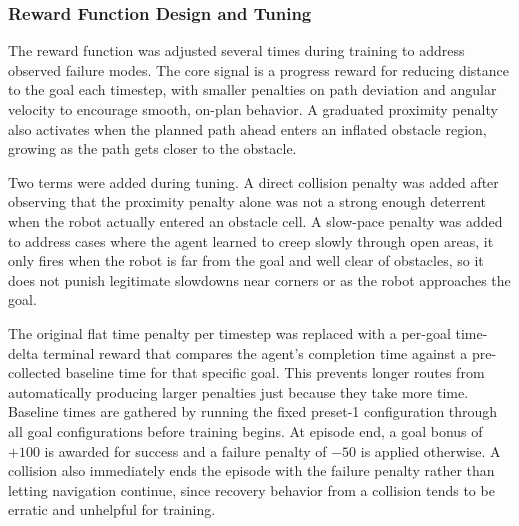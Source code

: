 \documentclass[conference]{IEEEtran}
\begin{document}
        \subsubsection{Reward Function Design and Tuning}
        The reward function was adjusted several times during training to address observed failure modes. The core signal is a progress reward for reducing distance to the goal each timestep, with smaller penalties on path deviation and angular velocity to encourage smooth, on-plan behavior. A graduated proximity penalty also activates when the planned path ahead enters an inflated obstacle region, growing as the path gets closer to the obstacle.

        Two terms were added during tuning. A direct collision penalty was added after observing that the proximity penalty alone was not a strong enough deterrent when the robot actually entered an obstacle cell. A slow-pace penalty was added to address cases where the agent learned to creep slowly through open areas, it only fires when the robot is far from the goal and well clear of obstacles, so it does not punish legitimate slowdowns near corners or as the robot approaches the goal.

        The original flat time penalty per timestep was replaced with a per-goal time-delta terminal reward that compares the agent's completion time against a pre-collected baseline time for that specific goal. This prevents longer routes from automatically producing larger penalties just because they take more time. Baseline times are gathered by running the fixed preset-1 configuration through all goal configurations before training begins. At episode end, a goal bonus of $+100$ is awarded for success and a failure penalty of $-50$ is applied otherwise. A collision also immediately ends the episode with the failure penalty rather than letting navigation continue, since recovery behavior from a collision tends to be erratic and unhelpful for training.

\end{document}

